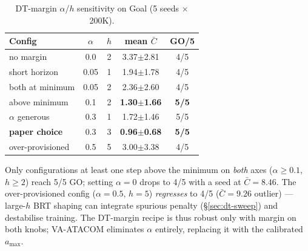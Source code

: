 \begin{table}[t]
\centering
\caption{DT-margin $\alpha$/$h$ sensitivity on Goal (5 seeds $\times$ 200K).}
\label{tab:alpha-h}
\begin{tabular}{lcccc}
\toprule
Config & $\alpha$ & $h$ & mean $\bar C$ & GO/5 \\
\midrule
no margin            & 0.0  & 2 & 3.37$\pm$2.81 & 4/5 \\
short horizon        & 0.05 & 1 & 1.94$\pm$1.78 & 4/5 \\
both at minimum      & 0.05 & 2 & 2.36$\pm$2.60 & 4/5 \\
above minimum        & 0.1  & 2 & \textbf{1.30$\pm$1.66} & \textbf{5/5} \\
$\alpha$ generous    & 0.3  & 1 & 1.72$\pm$1.46 & 5/5 \\
\textbf{paper choice}& 0.3  & 3 & \textbf{0.96$\pm$0.68} & \textbf{5/5} \\
over-provisioned     & 0.5  & 5 & 3.00$\pm$3.38 & 4/5 \\
\bottomrule
\end{tabular}
\end{table}

Only configurations at least one step above the minimum on \emph{both} axes ($\alpha{\ge}0.1$, $h{\ge}2$) reach 5/5 GO; setting $\alpha{=}0$ drops to 4/5 with a seed at $\bar C{=}8.46$. The over-provisioned config ($\alpha{=}0.5$, $h{=}5$) \emph{regresses} to 4/5 ($\bar C{=}9.26$ outlier) --- large-$h$ BRT shaping can integrate spurious penalty (\S\ref{sec:dt-sweep}) and destabilise training. The DT-margin recipe is thus robust only with margin on both knobs; VA-ATACOM eliminates $\alpha$ entirely, replacing it with the calibrated $a_{\max}$.
